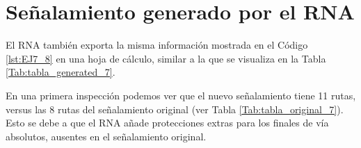 \section{Señalamiento generado por el RNA}

    El RNA también exporta la misma información mostrada en el Código \ref{lst:EJ7_8} en una hoja de cálculo, similar a la que se visualiza en la Tabla \ref{Tab:tabla_generated_7}.
    
    \begin{table}[H]
        {
        \caption{Tabla de enclavamiento del ejemplo 7 generada por el RNA.}
        \label{Tab:tabla_generated_7}
        \centering
     }
    \end{table}
    
    En una primera inspección podemos ver que el nuevo señalamiento tiene 11 rutas, versus las 8 rutas del señalamiento original (ver Tabla \ref{Tab:tabla_original_7}). Esto se debe a que el RNA añade protecciones extras para los finales de vía absolutos, ausentes en el señalamiento original.